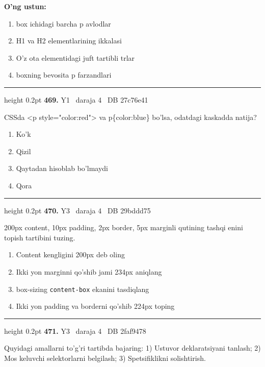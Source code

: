 \documentclass[10pt,a4paper,oneside]{article}
\begin{document}
\textbf{\footnotesize O'ng ustun:}
\begin{enumerate}[label=\Alph*),leftmargin=9mm]
\item box ichidagi barcha p avlodlar
\item H1 va H2 elementlarining ikkalasi
\item O'z ota elementidagi juft tartibli trlar
\item boxning bevosita p farzandlari
\end{enumerate}
\vspace{2mm}\hrule height 0.2pt \vspace{4mm}
\hypertarget{q469}{\textbf{\color{ink}469.}}  {\color{muted}\scriptsize Y1 \textbullet\ daraja 4 \textbullet\ DB 27c76e41}
\par
CSSda \textless{}p style="color:red"\textgreater{} va p\{color:blue\} bo'lsa, odatdagi kaskadda natija?
\begin{enumerate}[label=\Alph*),leftmargin=9mm]
\item Ko'k
\item Qizil
\item Qaytadan hisoblab bo'lmaydi
\item Qora
\end{enumerate}
\vspace{2mm}\hrule height 0.2pt \vspace{4mm}
\hypertarget{q470}{\textbf{\color{ink}470.}}  {\color{muted}\scriptsize Y3 \textbullet\ daraja 4 \textbullet\ DB 29bddd75}
\par
200px content, 10px padding, 2px border, 5px marginli qutining tashqi enini topish tartibini tuzing.
\begin{enumerate}[label=\Alph*),leftmargin=9mm]
\item Content kengligini 200px deb oling
\item Ikki yon marginni qo'shib jami 234px aniqlang
\item box-sizing \texttt{content-box} ekanini tasdiqlang
\item Ikki yon padding va borderni qo'shib 224px toping
\end{enumerate}
\vspace{2mm}\hrule height 0.2pt \vspace{4mm}
\hypertarget{q471}{\textbf{\color{ink}471.}}  {\color{muted}\scriptsize Y3 \textbullet\ daraja 4 \textbullet\ DB 2faf9478}
\par
Quyidagi amallarni to'g'ri tartibda bajaring: 1) Ustuvor deklaratsiyani tanlash; 2) Mos keluvchi selektorlarni belgilash; 3) Spetsifiklikni solishtirish.
\end{document}
